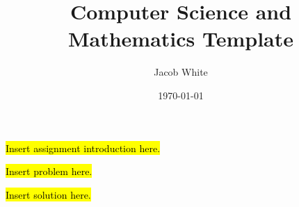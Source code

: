 \documentclass{article}
\title{Computer Science and Mathematics Template}
\author{Jacob White}
\date{\today}
\begin{document}
\maketitle

\noindent \hl{Insert assignment introduction here.}

\begin{problem} 
    \hl{Insert problem here.}
\end{problem}
\begin{solution}
    \hl{Insert solution here.}
\end{solution}
\end{document}
